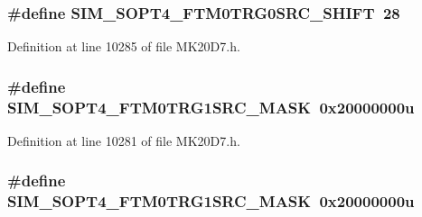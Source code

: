 \subsubsection[{\texorpdfstring{S\+I\+M\+\_\+\+S\+O\+P\+T4\+\_\+\+F\+T\+M0\+T\+R\+G0\+S\+R\+C\+\_\+\+S\+H\+I\+FT}{SIM_SOPT4_FTM0TRG0SRC_SHIFT}}]{\setlength{\rightskip}{0pt plus 5cm}\#define S\+I\+M\+\_\+\+S\+O\+P\+T4\+\_\+\+F\+T\+M0\+T\+R\+G0\+S\+R\+C\+\_\+\+S\+H\+I\+FT~28}\hypertarget{group___s_i_m___register___masks_ga76c7302a8f939758f0b68fb05ea6dd08}{}\label{group___s_i_m___register___masks_ga76c7302a8f939758f0b68fb05ea6dd08}


Definition at line 10285 of file M\+K20\+D7.\+h.

\subsubsection[{\texorpdfstring{S\+I\+M\+\_\+\+S\+O\+P\+T4\+\_\+\+F\+T\+M0\+T\+R\+G1\+S\+R\+C\+\_\+\+M\+A\+SK}{SIM_SOPT4_FTM0TRG1SRC_MASK}}]{\setlength{\rightskip}{0pt plus 5cm}\#define S\+I\+M\+\_\+\+S\+O\+P\+T4\+\_\+\+F\+T\+M0\+T\+R\+G1\+S\+R\+C\+\_\+\+M\+A\+SK~0x20000000u}\hypertarget{group___s_i_m___register___masks_ga427b99978dda3f6bf1c0a97559315276}{}\label{group___s_i_m___register___masks_ga427b99978dda3f6bf1c0a97559315276}


Definition at line 10281 of file M\+K20\+D7.\+h.

\subsubsection[{\texorpdfstring{S\+I\+M\+\_\+\+S\+O\+P\+T4\+\_\+\+F\+T\+M0\+T\+R\+G1\+S\+R\+C\+\_\+\+M\+A\+SK}{SIM_SOPT4_FTM0TRG1SRC_MASK}}]{\setlength{\rightskip}{0pt plus 5cm}\#define S\+I\+M\+\_\+\+S\+O\+P\+T4\+\_\+\+F\+T\+M0\+T\+R\+G1\+S\+R\+C\+\_\+\+M\+A\+SK~0x20000000u}\hypertarget{group___s_i_m___register___masks_ga427b99978dda3f6bf1c0a97559315276}{}\label{group___s_i_m___register___masks_ga427b99978dda3f6bf1c0a97559315276}


